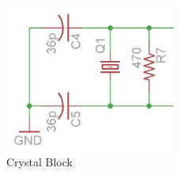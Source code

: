 \begin{figure}[h]
\centering
\includegraphics[width=0.5\textwidth]{functional-breakdown-crystal.png}
\caption{Crystal Block}
\label{fig:crystal-block}
\end{figure}

